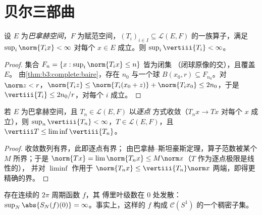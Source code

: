 \section{贝尔三部曲}

\begin{theorem}
\label{thm:b3:banach:banachsteinhaus}
设 $E$ 为\emph{巴拿赫空间}，$F$ 为赋范空间，$(T_i)_{i\in
I} \subseteq \mathcal L(E, F)$ 的一族算子，满足 $\sup_i
\norm{T_ix} < \infty$ 对每个 $x \in E$ 成立。则 $\sup_i
\vertiii{T_i} < \infty$。
\end{theorem}

\begin{proof}
集合 $F_n = \{x : \sup_i\norm{T_ix} \leq n\}$ 皆为闭集
（闭球原像的交），且覆盖 $E$。
由\cref{thm:b3:complete:baire}，存在 $n_0$ 与一个球
$B(x_0, r) \subseteq F_{n_0}$。对 $\norm z < r$，$\norm{T_iz}
\leq \norm{T_i(x_0 + z)} + \norm{T_ix_0} \leq 2n_0$，于是
$\vertiii{T_i} \leq 2n_0/r$，对每个 $i$ 成立。
\end{proof}

\begin{corollary}\label{cor:b3:banach:bslimits}
若 $E$ 为巴拿赫空间，且 $T_n \in \mathcal L(E,F)$ 以\emph{逐点}
方式收敛（$T_nx \to Tx$ 对每个 $x$ 成立），则 $\sup_n
\vertiii{T_n} < \infty$，$T \in \mathcal L(E, F)$，且
$\vertiii T \leq \liminf \vertiii{T_n}$。
\end{corollary}

\begin{proof}
收敛数列有界，此即逐点有界；
由巴拿赫--斯坦豪斯定理，算子范数被某个 $M$ 所界；于是 $\norm{Tx}
= \lim\norm{T_nx} \leq M\norm x$（$T$ 作为逐点极限是线性的），
并对 $\liminf$ 作用于
$\norm{T_nx} \leq \vertiii{T_n}\norm x$ 两端，即得更精确的界。
\end{proof}

\begin{theorem}[发散的傅里叶级数]
\label{thm:b3:banach:fourierdiverge}
存在连续的 $2\pi$ 周期函数 $f$，其
傅里叶级数在 $0$ 处发散：$\sup_N\abs{S_N(f)(0)} =
\infty$。事实上，这样的 $f$ 构成 $\mathcal
C(S^1)$ 的一个稠密子集。
\end{theorem}

